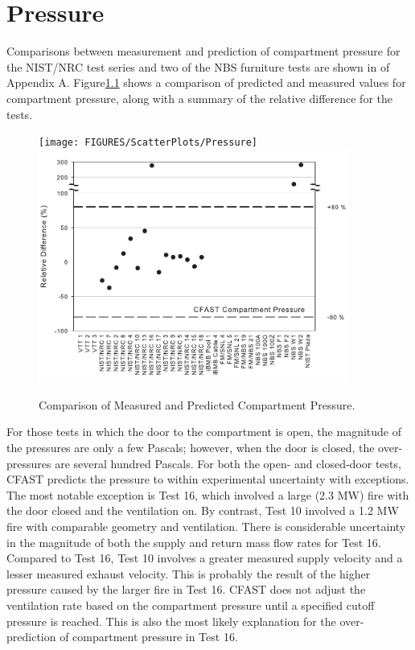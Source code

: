 \chapter{Pressure}

Comparisons between measurement and prediction of compartment pressure for the NIST/NRC test series and two of the NBS furniture tests are shown in of Appendix A.  Figure\ref{fig:Pressure_Scatter} shows a comparison of predicted and measured values for compartment pressure, along with a summary of the relative difference for the tests.

\begin{figure}
\begin{center}
\texttt{[image: FIGURES/ScatterPlots/Pressure]}  \\
\includegraphics[width=4.0in]{FIGURES/Relative_Diff/Pressure}  
\end{center}
\caption{Comparison of Measured and Predicted Compartment Pressure.} \label{fig:Pressure_Scatter}
\end{figure}

For those tests in which the door to the compartment is open, the magnitude of the pressures are only a few Pascals; however, when the door is closed, the over-pressures are several hundred Pascals.  For both the open- and closed-door tests, CFAST predicts the pressure to within experimental uncertainty with exceptions.  The most notable exception is Test 16, which involved a large (2.3 MW) fire with the door closed and the ventilation on.  By contrast, Test 10 involved a 1.2 MW fire with comparable geometry and ventilation.  There is considerable uncertainty in the magnitude of both the supply and return mass flow rates for Test 16.  Compared to Test 16, Test 10 involves a greater measured supply velocity and a lesser measured exhaust velocity.  This is probably the result of the higher pressure caused by the larger fire in Test 16.  CFAST does not adjust the ventilation rate based on the compartment pressure until a specified cutoff pressure is reached.  This is also the most likely explanation for the over-prediction of compartment pressure in Test 16.

